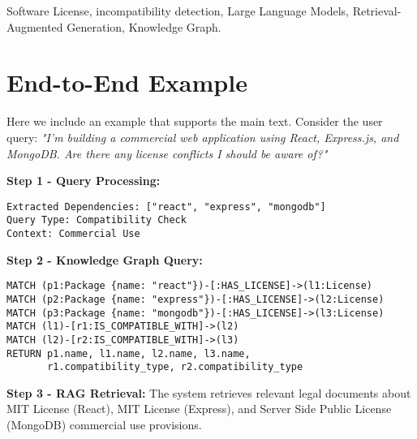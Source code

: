 \documentclass[review]{elsarticle}
\begin{document}
\begin{frontmatter}
\begin{abstract}
\end{abstract}

\begin{keyword}
Software License, incompatibility detection, Large Language Models, Retrieval-Augmented Generation, Knowledge Graph.
\end{keyword}

\end{frontmatter}









%


%





\appendix
\section{End-to-End Example}
\label{APP1}
Here we include an example that supports the main text.
Consider the user query: \textit{"I'm building a commercial web application using React, Express.js, and MongoDB. Are there any license conflicts I should be aware of?"}

\textbf{Step 1 - Query Processing:}
\begin{verbatim}
Extracted Dependencies: ["react", "express", "mongodb"]
Query Type: Compatibility Check
Context: Commercial Use
\end{verbatim}

\textbf{Step 2 - Knowledge Graph Query:}
\begin{verbatim}
MATCH (p1:Package {name: "react"})-[:HAS_LICENSE]->(l1:License)
MATCH (p2:Package {name: "express"})-[:HAS_LICENSE]->(l2:License)  
MATCH (p3:Package {name: "mongodb"})-[:HAS_LICENSE]->(l3:License)
MATCH (l1)-[r1:IS_COMPATIBLE_WITH]->(l2)
MATCH (l2)-[r2:IS_COMPATIBLE_WITH]->(l3)
RETURN p1.name, l1.name, l2.name, l3.name, 
       r1.compatibility_type, r2.compatibility_type
\end{verbatim}

\textbf{Step 3 - RAG Retrieval:}
The system retrieves relevant legal documents about MIT License (React), MIT License (Express), and Server Side Public License (MongoDB) commercial use provisions.
\end{document}
